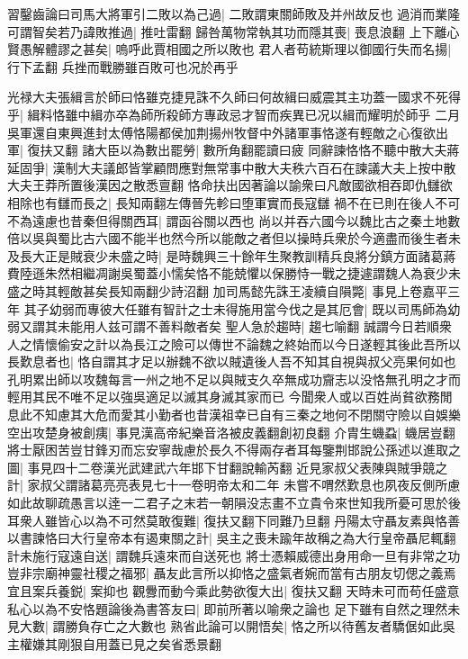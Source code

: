習鑿齒論曰司馬大將軍引二敗以為己過|{
	二敗謂東關師敗及并州故反也}
過消而業隆可謂智矣若乃諱敗推過|{
	推吐雷翻}
歸咎萬物常執其功而隱其喪|{
	喪息浪翻}
上下離心賢愚解體謬之甚矣|{
	嗚呼此賈相國之所以敗也}
君人者苟統斯理以御國行失而名揚|{
	行下孟翻}
兵挫而戰勝雖百敗可也况於再乎

光禄大夫張緝言於師曰恪雖克捷見誅不久師曰何故緝曰威震其主功蓋一國求不死得乎|{
	緝料恪雖中緝亦卒為師所殺師方專政忌才智而疾異已况以緝而耀明於師乎}
二月吳軍還自東興進封太傅恪陽都侯加荆揚州牧督中外諸軍事恪遂有輕敵之心復欲出軍|{
	復扶又翻}
諸大臣以為數出罷勞|{
	數所角翻罷讀曰疲}
同辭諫恪恪不聽中散大夫蔣延固爭|{
	漢制大夫議郎皆掌顧問應對無常事中散大夫秩六百石在諫議大夫上按中散大夫王莽所置後漢因之散悉亶翻}
恪命扶出因著論以諭衆曰凡敵國欲相吞即仇讎欲相除也有讎而長之|{
	長知兩翻左傳晉先軫曰堕軍實而長寇讎}
禍不在已則在後人不可不為遠慮也昔秦但得關西耳|{
	謂函谷關以西也}
尚以并吞六國今以魏比古之秦土地數倍以吳與蜀比古六國不能半也然今所以能敵之者但以操時兵衆於今適盡而後生者未及長大正是賊衰少未盛之時|{
	是時魏興三十餘年生聚教訓精兵良將分鎮方面諸葛蔣費陸遜朱然相繼凋謝吳蜀蓋小懦矣恪不能兢懼以保勝恃一戰之捷遽謂魏人為衰少未盛之時其輕敵甚矣長知兩翻少詩沼翻}
加司馬懿先誅王凌續自隕斃|{
	事見上卷嘉平三年}
其子幼弱而專彼大任雖有智計之士未得施用當今伐之是其厄會|{
	既以司馬師為幼弱又謂其未能用人兹可謂不善料敵者矣}
聖人急於趨時|{
	趨七喻翻}
誠謂今日若順衆人之情懷偷安之計以為長江之險可以傳世不論魏之終始而以今日遂輕其後此吾所以長歎息者也|{
	恪自謂其才足以辦魏不欲以賊遺後人吾不知其自視與叔父亮果何如也孔明累出師以攻魏每言一州之地不足以與賊支久卒無成功齎志以没恪無孔明之才而輕用其民不唯不足以強吳適足以滅其身滅其家而已}
今聞衆人或以百姓尚貧欲務閒息此不知慮其大危而愛其小勤者也昔漢祖幸已自有三秦之地何不閉關守險以自娛樂空出攻楚身被創痍|{
	事見漢高帝紀樂音洛被皮義翻創初良翻}
介胄生蟣蝨|{
	蟣居豈翻}
將士厭困苦豈甘鋒刃而忘安寧哉慮於長久不得兩存者耳每鑒荆邯說公孫述以進取之圖|{
	事見四十二卷漢光武建武六年邯下甘翻說輸芮翻}
近見家叔父表陳與賊爭競之計|{
	家叔父謂諸葛亮亮表見七十一卷明帝太和二年}
未嘗不喟然歎息也夙夜反側所慮如此故聊疏愚言以逹一二君子之末若一朝隕没志畫不立貴令來世知我所憂可思於後耳衆人雖皆心以為不可然莫敢復難|{
	復扶又翻下同難乃旦翻}
丹陽太守聶友素與恪善以書諫恪曰大行皇帝本有遏東關之計|{
	吳主之喪未踰年故稱之為大行皇帝聶尼輒翻}
計未施行寇遠自送|{
	謂魏兵遠來而自送死也}
將士憑賴威德出身用命一旦有非常之功豈非宗廟神靈社稷之福邪|{
	聶友此言所以抑恪之盛氣者婉而當有古朋友切偲之義焉}
宜且案兵養鋭|{
	案抑也}
觀釁而動今乘此勢欲復大出|{
	復扶又翻}
天時未可而苟任盛意私心以為不安恪題論後為書答友曰|{
	即前所著以喻衆之論也}
足下雖有自然之理然未見大數|{
	謂勝負存亡之大數也}
熟省此論可以開悟矣|{
	恪之所以待舊友者驕倨如此吳主權嫌其剛狠自用蓋已見之矣省悉景翻}
